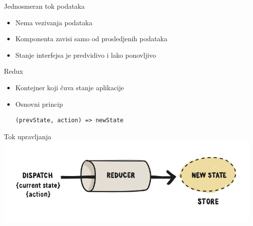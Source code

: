 \documentclass{beamer}
\begin{document}
\begin{frame}{Jednosmeran tok podataka}
    \begin{itemize}
    	\item Nema vezivanja podataka
    	\item Komponenta zavisi samo od prosledjenih podataka
    	\item Stanje interfejsa je predvidivo i lako ponovljivo
    \end{itemize}
\end{frame}

\begin{frame}[fragile]{Redux}
    \begin{itemize}
    	\item Kontejner koji čuva stanje aplikacije
    	\item Osnovni princip
    	\begin{verbatim}
(prevState, action) => newState
    	\end{verbatim}
    \end{itemize}
\end{frame}

\begin{frame}{Tok upravljanja}
      \includegraphics[scale=0.5]{./resources/redux.jpg}
\end{frame}

\end{document}
